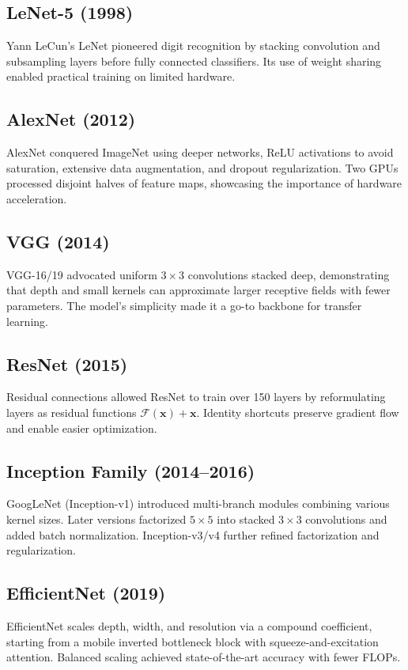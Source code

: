 ﻿\documentclass[12pt]{article}
\begin{document}
\subsection{LeNet-5 (1998)}
Yann LeCun's LeNet pioneered digit recognition by stacking convolution and subsampling layers before fully connected classifiers. Its use of weight sharing enabled practical training on limited hardware.

\subsection{AlexNet (2012)}
AlexNet conquered ImageNet using deeper networks, ReLU activations to avoid saturation, extensive data augmentation, and dropout regularization. Two GPUs processed disjoint halves of feature maps, showcasing the importance of hardware acceleration.

\subsection{VGG (2014)}
VGG-16/19 advocated uniform $3 \times 3$ convolutions stacked deep, demonstrating that depth and small kernels can approximate larger receptive fields with fewer parameters. The model's simplicity made it a go-to backbone for transfer learning.

\subsection{ResNet (2015)}
Residual connections allowed ResNet to train over 150 layers by reformulating layers as residual functions $\mathcal{F}(\mathbf{x}) + \mathbf{x}$. Identity shortcuts preserve gradient flow and enable easier optimization.

\subsection{Inception Family (2014--2016)}
GoogLeNet (Inception-v1) introduced multi-branch modules combining various kernel sizes. Later versions factorized $5 \times 5$ into stacked $3 \times 3$ convolutions and added batch normalization. Inception-v3/v4 further refined factorization and regularization.

\subsection{EfficientNet (2019)}
EfficientNet scales depth, width, and resolution via a compound coefficient, starting from a mobile inverted bottleneck block with squeeze-and-excitation attention. Balanced scaling achieved state-of-the-art accuracy with fewer FLOPs.
\end{document}
